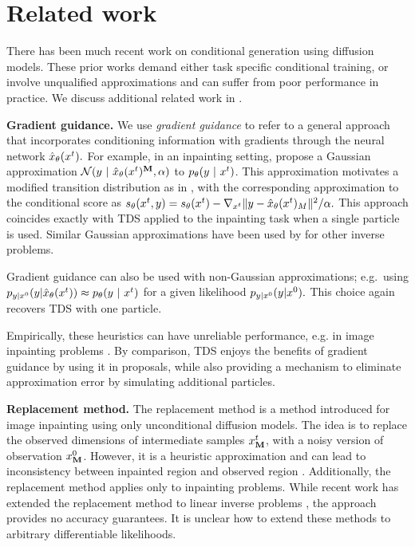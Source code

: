 \section{Related work}\label{sec:related-works}
There has been much recent work on conditional generation using diffusion models.
These prior works demand either task specific conditional training,
or involve unqualified approximations and can suffer from poor performance in practice.
We discuss additional related work in .

\textbf{Gradient guidance.}
We use \emph{gradient guidance} to refer to a general approach that incorporates conditioning information with gradients through the neural network ${\hat x}_\theta(x^{t}).$
For example, in an inpainting setting, \citet{hovideo} propose a Gaussian approximation $\mathcal{N}(y~\vert~ {\hat x}_\theta(x^{t})^{\mathbf{M}}, \alpha)$ to $p_{\theta}(y ~\vert~ x^{t})$. This approximation motivates a modified transition distribution as in , with the corresponding approximation to the conditional score as 
$
s_\theta(x^{t},y ) = s_\theta(x^{t}) - \nabla_{x^{t}} \| y - {\hat x}_\theta(x^{t})_M\|^2/\alpha.
$
This approach coincides exactly with TDS applied to the inpainting task when a single particle is used.
Similar Gaussian approximations have been used by \citep{chung2022diffusion,song2023pseudoinverse} for other inverse problems.

Gradient guidance can also be used with non-Gaussian approximations;
e.g.\ using $p_{y|x^{0}}({y}|{{\hat x}_\theta (x^{t}})) \approx p_{\theta} (y ~\vert~ x^{t})$ for a given likelihood $p_{y|x^{0}}({y}|{x^{0}}).$
This choice again recovers TDS with one particle. 

Empirically, these heuristics can have unreliable performance, e.g. in image inpainting problems \citep{zhang2023towards}.
By comparison, TDS enjoys the benefits of gradient guidance by using it in proposals, while also providing a mechanism to eliminate approximation error by simulating additional particles.

\textbf{Replacement method.}
The replacement method \citep{song2020score} is a method introduced for image inpainting using only unconditional diffusion models.
The idea is to replace the observed dimensions of intermediate samples $x^{t}_{\mathbf{M}}$, with a noisy version of observation $x^{0}_{\mathbf{M}}$.
However, it is a heuristic approximation and can lead to inconsistency between inpainted region and observed region \citep{lugmayr2022repaint}. 
Additionally, the replacement method applies only to inpainting problems.
While recent work has extended the replacement method to linear inverse problems \citep[e.g.][]{kawar2022denoising},
the approach provides no accuracy guarantees. It is unclear how to extend these methods to arbitrary differentiable likelihoods.


